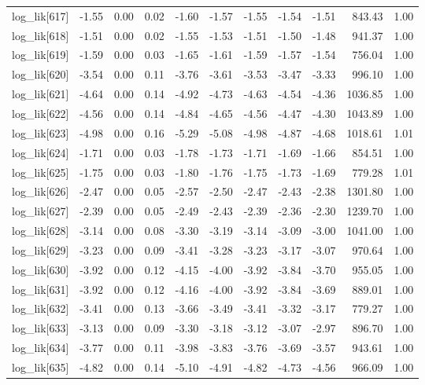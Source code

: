 \begin{table}[ht]
\begin{tabular}{rrrrrrrrrrr}
  log\_lik[617] & -1.55 & 0.00 & 0.02 & -1.60 & -1.57 & -1.55 & -1.54 & -1.51 & 843.43 & 1.00 \\ 
  log\_lik[618] & -1.51 & 0.00 & 0.02 & -1.55 & -1.53 & -1.51 & -1.50 & -1.48 & 941.37 & 1.00 \\ 
  log\_lik[619] & -1.59 & 0.00 & 0.03 & -1.65 & -1.61 & -1.59 & -1.57 & -1.54 & 756.04 & 1.00 \\ 
  log\_lik[620] & -3.54 & 0.00 & 0.11 & -3.76 & -3.61 & -3.53 & -3.47 & -3.33 & 996.10 & 1.00 \\ 
  log\_lik[621] & -4.64 & 0.00 & 0.14 & -4.92 & -4.73 & -4.63 & -4.54 & -4.36 & 1036.85 & 1.00 \\ 
  log\_lik[622] & -4.56 & 0.00 & 0.14 & -4.84 & -4.65 & -4.56 & -4.47 & -4.30 & 1043.89 & 1.00 \\ 
  log\_lik[623] & -4.98 & 0.00 & 0.16 & -5.29 & -5.08 & -4.98 & -4.87 & -4.68 & 1018.61 & 1.01 \\ 
  log\_lik[624] & -1.71 & 0.00 & 0.03 & -1.78 & -1.73 & -1.71 & -1.69 & -1.66 & 854.51 & 1.00 \\ 
  log\_lik[625] & -1.75 & 0.00 & 0.03 & -1.80 & -1.76 & -1.75 & -1.73 & -1.69 & 779.28 & 1.01 \\ 
  log\_lik[626] & -2.47 & 0.00 & 0.05 & -2.57 & -2.50 & -2.47 & -2.43 & -2.38 & 1301.80 & 1.00 \\ 
  log\_lik[627] & -2.39 & 0.00 & 0.05 & -2.49 & -2.43 & -2.39 & -2.36 & -2.30 & 1239.70 & 1.00 \\ 
  log\_lik[628] & -3.14 & 0.00 & 0.08 & -3.30 & -3.19 & -3.14 & -3.09 & -3.00 & 1041.00 & 1.00 \\ 
  log\_lik[629] & -3.23 & 0.00 & 0.09 & -3.41 & -3.28 & -3.23 & -3.17 & -3.07 & 970.64 & 1.00 \\ 
  log\_lik[630] & -3.92 & 0.00 & 0.12 & -4.15 & -4.00 & -3.92 & -3.84 & -3.70 & 955.05 & 1.00 \\ 
  log\_lik[631] & -3.92 & 0.00 & 0.12 & -4.16 & -4.00 & -3.92 & -3.84 & -3.69 & 889.01 & 1.00 \\ 
  log\_lik[632] & -3.41 & 0.00 & 0.13 & -3.66 & -3.49 & -3.41 & -3.32 & -3.17 & 779.27 & 1.00 \\ 
  log\_lik[633] & -3.13 & 0.00 & 0.09 & -3.30 & -3.18 & -3.12 & -3.07 & -2.97 & 896.70 & 1.00 \\ 
  log\_lik[634] & -3.77 & 0.00 & 0.11 & -3.98 & -3.83 & -3.76 & -3.69 & -3.57 & 943.61 & 1.00 \\ 
  log\_lik[635] & -4.82 & 0.00 & 0.14 & -5.10 & -4.91 & -4.82 & -4.73 & -4.56 & 966.09 & 1.00 \\ 

\end{tabular}
\end{table}
